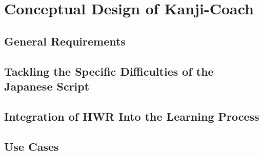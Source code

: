 
\chapter{Conceptual Design of Kanji-Coach}
\label{chap:conceptualdesignofkanjicoach}

\section{General Requirements}
\label{sec:concept:generalrequirements}



\section{Tackling the Specific Difficulties of the Japanese Script}
\label{sec:concept:tacklingdifficulties}


\section{Integration of HWR Into the Learning Process}
\label{sec:concept:integrationofhwrintolearning}



\section{Use Cases}
\label{sec:concept:usecases}

